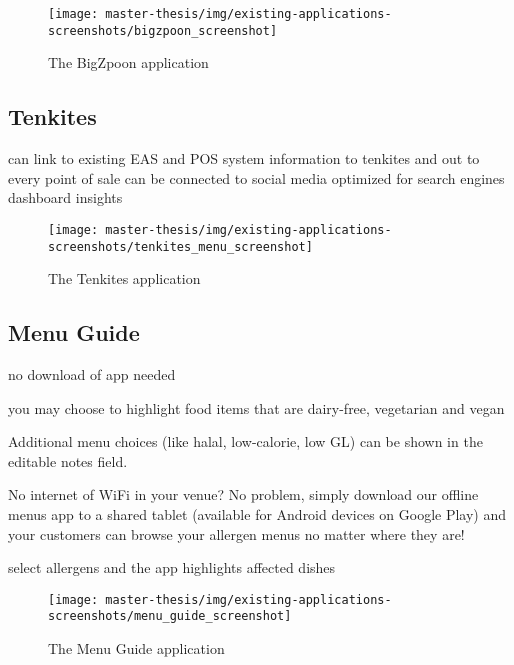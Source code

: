   \begin{figure}[h]
    \centering
    \texttt{[image: master-thesis/img/existing-applications-screenshots/bigzpoon\_screenshot]}
    \caption{The BigZpoon application}
  \end{figure}

\subsection*{Tenkites}
  can link to existing EAS and POS system
  information to tenkites and out to every point of sale
  can be connected to social media
  optimized for search engines
  dashboard insights

  \begin{figure}[h]
    \centering
    \texttt{[image: master-thesis/img/existing-applications-screenshots/tenkites\_menu\_screenshot]}
    \caption{The Tenkites application}
  \end{figure}

\subsection*{Menu Guide}
  no download of app needed

  you may choose to highlight food items that are dairy-free, vegetarian and vegan

  Additional menu choices (like halal, low-calorie, low GL) can be shown in the editable notes field.

  No internet of WiFi in your venue? No problem, simply download our offline menus app to a shared tablet (available for Android devices on Google Play) and your customers can browse your allergen menus no matter where they are!

  select allergens and the app highlights affected dishes

  \begin{figure}[h]
    \centering
    \texttt{[image: master-thesis/img/existing-applications-screenshots/menu\_guide\_screenshot]}
    \caption{The Menu Guide application}
  \end{figure}


